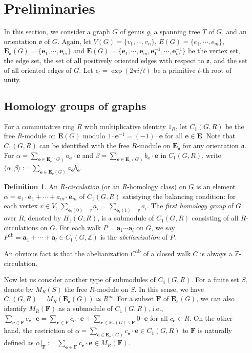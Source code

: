 \documentclass[11pt]{amsart}
\renewcommand{\setminus}{\mathbin{\backslash}}%
\theoremstyle{plain}
\theoremstyle{definition}
\newtheorem{definition}[theorem]{Definition}
\newcommand{\mbbZ}{{\mathbb Z}}
\newcommand{\mfrako}{{\mathfrak o}}
\newcommand{\va}{{\mathbf a}}
\newcommand{\ve}{{\mathbf e}}
\newcommand{\vE}{{\mathbf E}}
\newcommand{\vF}{{\mathbf F}}
\DeclareMathOperator{\ab}{\operatorname{ab}}
\numberwithin{equation}{section}
\begin{document}
\section{Preliminaries}
In this section, we consider a graph $G$ of genus $g$, a spanning tree $T$ of $G$, and an orientation $\mfrako$ of $G$. Again, let $V(G)=\{v_1,\cdots,v_n\}$, $E(G)=\{e_1,\cdots,e_m\}$, $\vE_\mfrako(G) = \{\ve_1,\cdots,\ve_m\}$ and $\vE(G)= \{\ve_1,\cdots,\ve_m,\ve_1^{-1},\cdots,\ve_m^{-1}\}$ be the vertex set, the edge set, the set of all positively oriented edges with respect to $\mfrako$, and the set of all oriented edges of $G$. Let $\epsilon_t=\exp(2\pi i/t)$ be a primitive $t$-th root of unity.

\subsection{Homology groups of graphs}
For a commutative ring $R$ with multiplicative identity $1_R$, let $C_1(G,R)$ be the free $R$-module on  $\vE(G)$ modulo $1\cdot \ve^{-1} = (-1)\cdot \ve$ for all $\ve\in \vE$. 
Note that $C_1(G,R)$ can be identified with the free $R$-module on $\vE_\mfrako$ for any orientation $\mfrako$. For $\alpha = \sum_{\ve\in \vE_\mfrako(G)}a_\ve\cdot \ve$ and $\beta = \sum_{\ve\in \vE_\mfrako(G)}b_\ve\cdot \ve$ in $C_1(G,R)$, write  $\langle\alpha,\beta\rangle := \sum_{\ve\in \vE_\mfrako(G)} a_\ve b_\ve$. 

\begin{definition}
An \emph{$R$-circulation} (or an $R$-homology class) on $G$ is an element $\alpha = a_1\cdot \ve_1+\cdots+a_m\cdot \ve_m$ of $C_1(G,R)$ satisfying the balancing condition: for each vertex $v\in V$, $\sum_{\ve_i(0)=v} a_i = \sum_{\ve_i(1)=v} a_i$. The \emph{first homology group} of $G$ over $R$, denoted by $H_1(G,R)$, is a submodule of $C_1(G,R)$ consisting of all $R$-circulations on $G$. 
For each walk $P=\va_1\cdots \va_l$ on $G$, we say $P^{\ab}=\va_1+\cdots+\va_l \in C_1(G,\mbbZ)$ is the \emph{abelianization} of $P$. 
\end{definition}


An obvious fact is that the abelianization $C^{\ab}$ of a closed walk $C$ is always a $\mbbZ$-circulation. 



Now let us consider another type of submodules of $C_1(G,R)$. For a finite set $S$, denote by $M_R(S)$ the free $R$-module on $S$. In this sense, we have $C_1(G,R)=M_R(\vE_\mfrako(G))\simeq R^m$. For a subset $\vF$ of $\vE_\mfrako(G)$, we can also identify $M_R(\vF)$ as a submodule of $C_1(G,R)$, i.e., $\sum_{\ve\in \vF}c_\ve\cdot \ve = \sum_{\ve\in \vF}c_\ve\cdot \ve+\sum_{\ve\in \vE_\mfrako(G)\setminus \vF} 0\cdot \ve$ for all $c_\ve\in R$. On the other hand, the restriction of $\alpha = \sum_{\ve\in \vE_\mfrako(G) }c_\ve\cdot \ve \in C_1(G,R)$ to $\vF$ is naturally defined as $\alpha|_{\vF} := \sum_{\ve\in \vF}c_\ve\cdot \ve\in M_R(\vF)$. 
\end{document}
